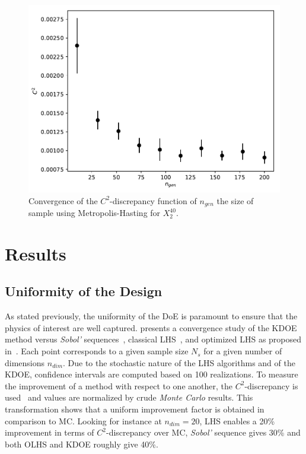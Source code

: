 \begin{figure}[!h]
\centering
\includegraphics[width=0.9\linewidth,keepaspectratio]{fig/contributions/doe/conv_C2-Ngen-Kdoe2-40.pdf}
\caption{Convergence of the $C^2$-discrepancy function of $n_{gen}$ the size of sample using Metropolis-Hasting for $X_2^{40}$.}
\label{fig:conv-ngen}
\end{figure}





\section{Results}\label{sec:results}

\subsection{Uniformity of the Design}
As stated previously, the uniformity of the DoE is paramount to ensure that the physics of interest are well captured.  presents a convergence study of the KDOE method versus \emph{Sobol'} sequences~\citep{Sobol1967}, classical LHS~\citep{Mckay1979}, and optimized LHS as proposed in~\citep{Baudin2015a}. Each point corresponds to a given sample size $N_s$ for a given number of dimensions $n_{dim}$. Due to the stochastic nature of the LHS algorithms and of the KDOE, confidence intervals are computed based on 100 realizations. To measure the improvement of a method with respect to one another, the $C^2$-discrepancy is used~\citep{Fang2006,Androulakis2016} and values are normalized by crude \emph{Monte Carlo} results. This transformation shows that a uniform improvement factor is obtained in comparison to MC. Looking for instance at $n_{dim} = 20$, LHS enables a 20\% improvement in terms of $C^2$-discrepancy over MC, \emph{Sobol'} sequence gives 30\% and both OLHS and KDOE roughly give 40\%.

